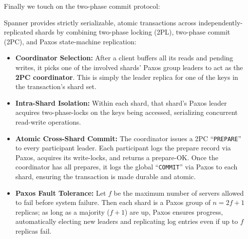     \newpage 

    \noindent
    Finally we touch on the two-phase commit protocol:

    \begin{Def}

        Spanner provides strictly serializable, atomic transactions across independently-replicated shards by combining two-phase locking (2PL), two-phase commit (2PC), and Paxos state-machine replication:
        
        \begin{itemize}
          \item \textbf{Coordinator Selection:}  
            After a client buffers all its reads and pending writes, it picks one of the involved shards' Paxos group leaders to act as the \textbf{2PC coordinator}.  
            This is simply the leader replica for one of the keys in the transaction's shard set.  
          \item \textbf{Intra-Shard Isolation:}  
            Within each shard, that shard's Paxos leader acquires two-phase-locks on the keys being accessed, serializing concurrent read-write operations.
          \item \textbf{Atomic Cross-Shard Commit:}  
            The coordinator issues a 2PC ``\texttt{PREPARE}'' to every participant leader. Each participant logs the prepare record via Paxos, acquires its write-locks, and returns a prepare-OK.  
            Once the coordinator has all prepares, it logs the global ``\texttt{COMMIT}'' via Paxos to each shard, ensuring the transaction is made durable and atomic.
          \item \textbf{Paxos Fault Tolerance:}  
            Let $f$ be the maximum number of servers allowed to fail before system failure. Then each shard is a Paxos group of \(n=2f+1\) replicas; as long as a majority (\(f+1\)) are up, Paxos ensures progress, automatically electing new leaders and replicating log entries even if up to \(f\) replicas fail.
           
        \end{itemize}
        \end{Def}
        
